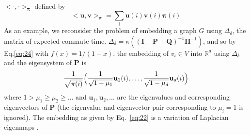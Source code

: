 \documentclass[10pt,twocolumn]{article}
\numberwithin{equation}{section}
\begin{document}
$<\cdot,\cdot>_{\bm{\pi}}$ defined by
\begin{equation}
  \label{eq:25}
  <\mathbf{u},\mathbf{v}>_{\bm{\pi}} =
  \sum_{i}{\mathbf{u}(i)\mathbf{v}(i) \bm{\pi}(i)}
\end{equation}
As an example, we reconsider the problem of embedding a graph $G$
using $\Delta_\delta$, the matrix of expected commute time.
$\Delta_\delta = \kappa((\mathbf{I} - \mathbf{P} +
\mathbf{Q})^{-1}\bm{\Pi}^{-1})$, and so by Eq.\eqref{eq:24} with $f(x)
= 1/(1-x)$, the embedding of $v_i \in V$ into $\mathbb{R}^{d}$ using
$\Delta_\delta$ and the eigensystem of $\mathbf{P}$ is
\begin{equation}
  \label{eq:22}
   \frac{1}{\sqrt{\pi(i)}} \Bigl(\frac{1}{\sqrt{1 - \mu_1}} \mathbf{u}_1(i),
    \dots, \frac{1}{\sqrt{1 - \mu_d}} \mathbf{u}_{d}(i)\Bigr)
\end{equation}
where $1 > \mu_1 \geq \mu_2 \geq \dots$ and $\mathbf{u}_1,
\mathbf{u}_2, \dots$ are the eigenvalues and corresponding
eigenvectors of $\mathbf{P}$ (the eigenvalue and eigenvector pair
corresponding to $\mu_i = 1$ is ignored). The embedding as given by
Eq.~\eqref{eq:22} is a variation of Laplacian eigenmaps
\cite{belkin03:_laplac}.  
%
\end{document}
